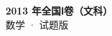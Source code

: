 \documentclass[zihao=-4, a4paper]{ctexart}
\begin{document}
\begin{center}
  {\Large\bfseries 2013 年全国Ⅰ卷（文科）}\\[4pt]
  {\large 数学 · 试题版}
\end{center}
\medskip
{}

\end{document}
